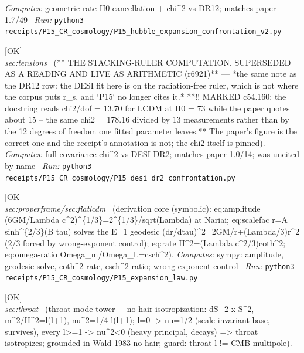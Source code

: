 \begin{description}
\emph{Computes:} geometric-rate H0-cancellation + chi\textasciicircum{}2 vs DR12; matches paper 1.7/49
\ \emph{Run:} \texttt{python3 receipts/P15\_CR\_cosmology/P15\_hubble\_expansion\_confrontation\_v2.py}
\item[\rcptlabel{P15_desi_dr2_confrontation}{P15R38}\textbf{P15R38}\quad\texttt{P15\_desi\_dr2\_confrontation}]\hfill\textsf{[OK]}\\
\textit{sec:tensions} \ (** THE STACKING-RULER COMPUTATION, SUPERSEDED AS A READING AND LIVE AS ARITHMETIC (r6921)** --- *the same note as the DR12 row: the DESI fit here is on the radiation-free ruler, which is not where the corpus puts r\_s, and `P15` no longer cites it.* **!! MARKED c54.160: the docstring reads chi2/dof = 13.70 for LCDM at H0 = 73 while the paper quotes about 15 -- the same chi2 = 178.16 divided by 13 measurements rather than by the 12 degrees of freedom one fitted parameter leaves.** The paper's figure is the correct one and the receipt's annotation is not; the chi2 itself is pinned). 
\emph{Computes:} full-covariance chi\textasciicircum{}2 vs DESI DR2; matches paper 1.0/14; was uncited by name
\ \emph{Run:} \texttt{python3 receipts/P15\_CR\_cosmology/P15\_desi\_dr2\_confrontation.py}
\item[\rcptlabel{P15_expansion_law}{P15R39}\textbf{P15R39}\quad\texttt{P15\_expansion\_law}]\hfill\textsf{[OK]}\\
\textit{sec:properframe/sec:flatlcdm} \ (derivation core (symbolic): eq:amplitude (6GM/Lambda c\textasciicircum{}2)\textasciicircum{}\{1/3\}=2\textasciicircum{}\{1/3\}/sqrt(Lambda) at Nariai; eq:scalefac r=A sinh\textasciicircum{}\{2/3\}(B tau) solves the E=1 geodesic (dr/dtau)\textasciicircum{}2=2GM/r+(Lambda/3)r\textasciicircum{}2 (2/3 forced by wrong-exponent control); eq:rate H\textasciicircum{}2=(Lambda c\textasciicircum{}2/3)coth\textasciicircum{}2; eq:omega-ratio Omega\_m/Omega\_L=csch\textasciicircum{}2). 
\emph{Computes:} sympy: amplitude, geodesic solve, coth\textasciicircum{}2 rate, csch\textasciicircum{}2 ratio; wrong-exponent control
\ \emph{Run:} \texttt{python3 receipts/P15\_CR\_cosmology/P15\_expansion\_law.py}
\item[\rcptlabel{P15_verify_throat_tower}{P15R40}\textbf{P15R40}\quad\texttt{P15\_verify\_throat\_tower}]\hfill\textsf{[OK]}\\
\textit{sec:throat} \ (throat mode tower + no-hair isotropization: dS\_2 x S\textasciicircum{}2, m\textasciicircum{}2/H\textasciicircum{}2=l(l+1), nu\textasciicircum{}2=1/4-l(l+1); l=0 -> nu=1/2 (scale-invariant base, survives), every l>=1 -> nu\textasciicircum{}2<0 (heavy principal, decays) => throat isotropizes; grounded in Wald 1983 no-hair; guard: throat l != CMB multipole). 

\end{description}
